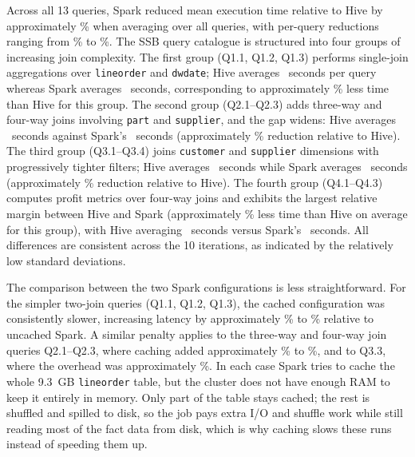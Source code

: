 Across all 13 queries, Spark reduced mean
execution time relative to Hive by approximately \PaperHSRedPctMeanAgg\% when
averaging over all queries, with per-query reductions ranging from
\PaperHSRedPctMin\% to \PaperHSRedPctMax\%. The SSB query catalogue is
structured into four groups of increasing join complexity. The first group
(Q1.1, Q1.2, Q1.3) performs single-join aggregations over \texttt{lineorder} and
\texttt{dwdate}; Hive averages \PaperExpHSGOneMeanHive~seconds per query whereas Spark averages
\PaperExpHSGOneMeanSpark~seconds, corresponding to approximately \PaperExpHSGOneRedPct\% less time than Hive for this group.
The second group (Q2.1--Q2.3) adds
three-way and four-way joins involving \texttt{part} and \texttt{supplier},
and the gap widens: Hive averages \PaperExpHSGTwoMeanHive~seconds against Spark's
\PaperExpHSGTwoMeanSpark~seconds (approximately \PaperExpHSGTwoRedPct\% reduction relative to Hive).
The third group (Q3.1--Q3.4) joins \texttt{customer} and
\texttt{supplier} dimensions with progressively tighter filters; Hive
averages \PaperExpHSGThreeMeanHive~seconds while Spark averages \PaperExpHSGThreeMeanSpark~seconds (approximately \PaperExpHSGThreeRedPct\% reduction relative to Hive).
The fourth group
(Q4.1--Q4.3) computes profit metrics over four-way joins and exhibits the
largest relative margin between Hive and Spark (approximately \PaperExpHSGFourRedPct\% less time than Hive on average for this group), with Hive averaging \PaperExpHSGFourMeanHive~seconds versus Spark's
\PaperExpHSGFourMeanSpark~seconds. All differences are consistent across the 10 iterations, as
indicated by the relatively low standard deviations.

The comparison between the two
Spark configurations is less straightforward. For the simpler two-join queries
(Q1.1, Q1.2, Q1.3), the cached configuration was consistently slower, increasing latency by approximately
\PaperExpCacheQOneOverMinPct\% to \PaperExpCacheQOneOverMaxPct\% relative to uncached Spark.
A similar penalty
applies to the three-way and four-way join queries Q2.1--Q2.3, where caching added approximately
\PaperExpCacheQTwoOverMinPct\% to \PaperExpCacheQTwoOverMaxPct\%, and to Q3.3, where the overhead was approximately \PaperExpCacheQThreeThreeOverPct\%. In
each case Spark tries to cache the whole 9.3~GB \texttt{lineorder} table, but the
cluster does not have enough RAM to keep it entirely in memory. Only part of the
table stays cached; the rest is shuffled and spilled to disk, so the job pays
extra I/O and shuffle work while still reading most of the fact data from disk,
which is why caching slows these runs instead of speeding them up.


